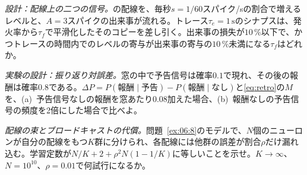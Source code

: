 \begin{exercise}[\lvlB]
\label{ex:07:6}
\emph{設計：配線上の二つの信号。}の配線を、毎秒$s=1/60$スパイク/sの割合で増えるレベルと、$A=3$スパイクの出来事が流れる。トレース$\tau_e=1\,\text{s}$のシナプスは、発火率から$\tau_f$で平滑化したそのコピーを差し引く。出来事の損失が$10\,\%$以下で、かつトレースの時間内でのレベルの寄与が出来事の寄与の$10\,\%$未満になる$\tau_f$はどれか。
\end{exercise}

\begin{exercise}[\lvlB]
\label{ex:07:7}
\emph{実験の設計：振り返り対誤差。}窓の中で予告信号は確率$0.1$で現れ、その後の報酬は確率$0.8$である。$\Delta P=P(\text{報酬}\mid\text{予告})-P(\text{報酬}\mid\text{なし})$と\eqref{eq:retro}の$M$を、(a)~予告信号なしの報酬を窓あたり$0.08$加えた場合、(b)~報酬なしの予告信号の頻度を2倍にした場合で比べよ。
\end{exercise}

\begin{exercise}[\lvlC]
\label{ex:07:8}
\emph{配線の束とブロードキャストの代償。}問題~\ref{ex:06:8}のモデルで、$N$個のニューロンが自分の配線をもつ$K$群に分けられ、各配線には他群の誤差が割合$\rho$だけ漏れ込む。学習定数が$N/K+2+\rho^2N(1-1/K)$に等しいことを示せ。$K\to\infty$、$N=10^{10}$、$\rho=0.01$で何試行になるか。
\end{exercise}

